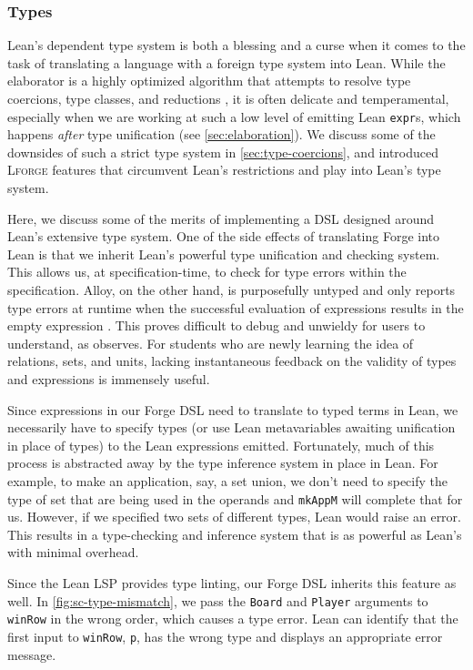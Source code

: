\subsubsection{Types}

Lean's dependent type system is both a blessing and a curse when it comes to the task of translating a language with a foreign type system into Lean. While the elaborator is a highly optimized algorithm that attempts to resolve type coercions, type classes, and reductions \cite{de2015lean}, it is often delicate and temperamental, especially when we are working at such a low level of emitting Lean \texttt{expr}s, which happens \emph{after} type unification (see \cref{sec:elaboration}). We discuss some of the downsides of such a strict type system in \cref{sec:type-coercions}, and introduced \textsc{Lforge} features that circumvent Lean's restrictions and play into Lean's type system. 

Here, we discuss some of the merits of implementing a DSL designed around Lean's extensive type system. One of the side effects of translating Forge into Lean is that we inherit Lean's powerful type unification and checking system. This allows us, at specification-time, to check for type errors within the specification. Alloy, on the other hand, is purposefully untyped \cite{jackson2019alloy} and only reports type errors at runtime when the successful evaluation of expressions results in the empty expression \cite{edwards2004type}. This proves difficult to debug and unwieldy for users to understand, as \cite{ngpdbccdlrrvwwk-oopsla-2024} observes. For students who are newly learning the idea of relations, sets, and units, lacking instantaneous feedback on the validity of types and expressions is immensely useful. 

Since expressions in our Forge DSL need to translate to typed terms in Lean, we necessarily have to specify types (or use Lean metavariables awaiting unification in place of types) to the Lean expressions emitted. Fortunately, much of this process is abstracted away by the type inference system in place in Lean. For example, to make an application, say, a set union, we don't need to specify the type of set that are being used in the operands and \texttt{mkAppM} will complete that for us. However, if we specified two sets of different types, Lean would raise an error. This results in a type-checking and inference system that is as powerful as Lean's with minimal overhead. 

Since the Lean LSP provides type linting, our Forge DSL inherits this feature as well. In \cref{fig:sc-type-mismatch}, we pass the \texttt{Board} and \texttt{Player} arguments to \texttt{winRow} in the wrong order, which causes a type error. Lean can identify that the first input to \texttt{winRow}, \texttt{p}, has the wrong type and displays an appropriate error message. 

